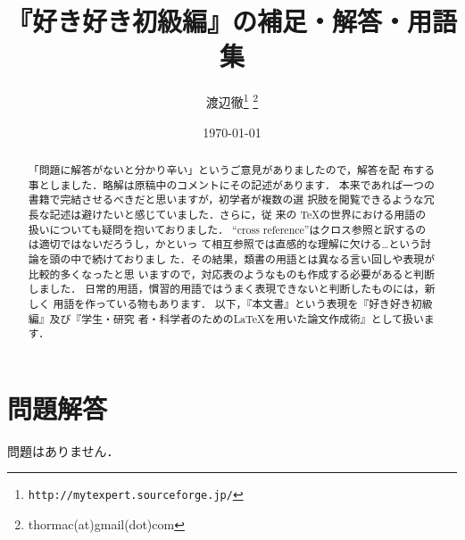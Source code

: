 \onecolumn

\title{『好き好き\LaTeXe 初級編』の補足・解答・用語集}
\author{渡辺徹\thanks{\texttt{http://mytexpert.sourceforge.jp/}}
  \thanks{thormac(at)gmail(dot)com}}
\date \today
\maketitle
\begin{abstract}
 「問題に解答がないと分かり辛い」というご意見がありましたので，解答を配
 布する事としました．略解は原稿中のコメントにその記述があります．
 本来であれば一つの書籍で完結させるべきだと思いますが，初学者が複数の選
 択肢を閲覧できるような冗長な記述は避けたいと感じていました．さらに，従
 来の \TeX の世界における用語の扱いについても疑問を抱いておりました．
 ``cross reference''はクロス参照と訳するのは適切ではないだろうし，かといっ
 て相互参照では直感的な理解に欠ける…という討論を頭の中で続けておりまし
 た．その結果，類書の用語とは異なる言い回しや表現が比較的多くなったと思
 いますので，対応表のようなものも作成する必要があると判断しました．
 日常的用語，慣習的用語ではうまく表現できないと判断したものには，新しく
 用語を作っている物もあります．
 以下，『本文書』という表現を『好き好き\LaTeXe 初級編』及び『学生・研究
 者・科学者のための\LaTeX を用いた論文作成術』として扱います．
\end{abstract}
\tableofcontents
\clearpage
\twocolumn

\section{問題解答}

問題はありません．

